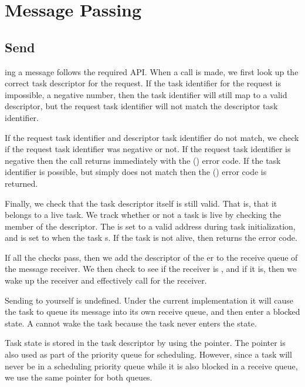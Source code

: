 \documentclass[pdftex,10pt,a4paper]{article}
\begin{document}
\newpage
\section*{Message Passing}


\subsection*{Send}

ing a message follows the required API. When a 
call is made, we first look up the correct task descriptor for the
request. If the task identifier for the request is impossible, a
negative number, then the task identifier will still map to a valid
descriptor, but the request task identifier will not match the
descriptor task identifier.

If the request task identifier and descriptor task identifier do not
match, we check if the request task identifier was negative or not. If
the request task identifier is negative then the  call
returns immediately with the  () error
code. If the task identifier is possible, but simply does not match
then the  () error code is returned.

Finally, we check that the task descriptor itself is still valid. That
is, that it belongs to a live task. We track whether or not a task
is live by checking the  member of the descriptor. The
 is set to a valid address during task initialization, and is
set to  when the task s. If the task is not alive,
then  returns the  error code.

If all the checks pass, then we add the descriptor of the er
to the receive queue of the message receiver. We then check to see if
the receiver is , and if it is, then we wake up the
receiver and effectively call  for the receiver.

Sending to yourself is undefined. Under the current implementation it
will cause the task to queue its message into its own receive queue,
and then enter a blocked state. A  cannot wake the task
because the task never enters the  state.

Task state is stored in the task descriptor by using the 
pointer. The  pointer is also used as part of the priority
queue for scheduling. However, since a task will never be in a
scheduling priority queue while it is also blocked in a receive queue,
we use the same  pointer for both queues.
\end{document}

